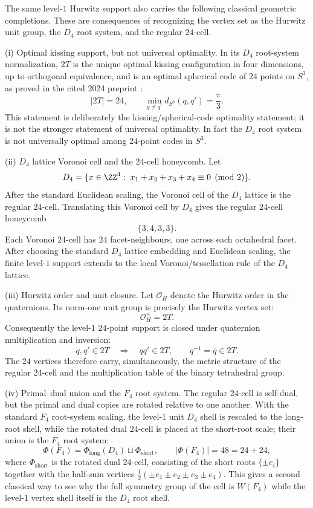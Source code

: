 \documentclass[11pt]{article}
\begin{document}
\begin{theorem}
\label{p1:thm:s3one-classical-completions}
The same level-\(1\) Hurwitz support also carries the following classical geometric
completions.  These are consequences of recognizing the vertex set as the
Hurwitz unit group, the $D_4$ root system, and the regular $24$-cell.

\smallskip
\noindent\textup{(i) Optimal kissing support, but not universal optimality.}
In its $D_4$ root-system normalization, $2T$ is the unique optimal kissing
configuration in four dimensions, up to orthogonal equivalence, and is an
optimal spherical code of $24$ points on $S^3$, as proved in the cited 2024
preprint \cite{deLaatLeijenhorstDeMuinckKeizer2024}:
\[
    |2T|=24,
    \qquad
    \min_{q\ne q'} d_{S^3}(q,q')=\frac\pi3.
\]
This statement is deliberately the kissing/spherical-code optimality statement;
it is not the stronger statement of universal optimality.  In fact the $D_4$
root system is not universally optimal among $24$-point codes in $S^3$.

\smallskip
\noindent\textup{(ii) $D_4$ lattice Voronoi cell and the $24$-cell honeycomb.}
Let
\[
    D_4=\{x\in\ZZ^4:\;x_1+x_2+x_3+x_4\equiv0\pmod2\}.
\]
After the standard Euclidean scaling, the Voronoi cell of the $D_4$ lattice is
the regular $24$-cell.  Translating this Voronoi cell by $D_4$ gives the regular
$24$-cell honeycomb
\[
    \{3,4,3,3\}.
\]
Each Voronoi $24$-cell has $24$ facet-neighbours, one across each octahedral
facet.  After choosing the standard $D_4$ lattice embedding and Euclidean scaling, the finite level-\(1\) support extends to the local
Voronoi/tessellation rule of the $D_4$ lattice.

\smallskip
\noindent\textup{(iii) Hurwitz order and unit closure.}
Let $\mathcal O_H$ denote the Hurwitz order in the quaternions.  Its norm-one
unit group is precisely the Hurwitz vertex set:
\[
    \mathcal O_H^\times=2T.
\]
Consequently the level-\(1\) $24$-point support is closed under quaternion
multiplication and inversion:
\[
    q,q'\in2T\quad\Longrightarrow\quad qq'\in2T,
    \qquad
    q^{-1}=\bar q\in2T.
\]
The $24$ vertices therefore carry, simultaneously, the metric structure of the
regular $24$-cell and the multiplication table of the binary tetrahedral group.

\smallskip
\noindent\textup{(iv) Primal--dual union and the $F_4$ root system.}
The regular $24$-cell is self-dual, but the primal and dual copies are rotated
relative to one another.  With the standard $F_4$ root-system scaling, the level-\(1\) unit $D_4$ shell is rescaled to the long-root shell, while the rotated dual $24$-cell is placed at the short-root scale; their union is the $F_4$ root system:
\[
    \Phi(F_4)=\Phi_{\mathrm{long}}(D_4)\sqcup\Phi_{\mathrm{short}},
    \qquad
    |\Phi(F_4)|=48=24+24,
\]
where \(\Phi_{\mathrm{short}}\) is the rotated dual $24$-cell, consisting of the
short roots \(\{\pm e_i\}\) together with the half-sum vertices
\(\frac12(\pm e_1\pm e_2\pm e_3\pm e_4)\).  This gives a second classical way to see why the full symmetry group of the
cell is $W(F_4)$ while the level-\(1\) vertex shell itself is the $D_4$ root shell.


\end{theorem}
\end{document}
